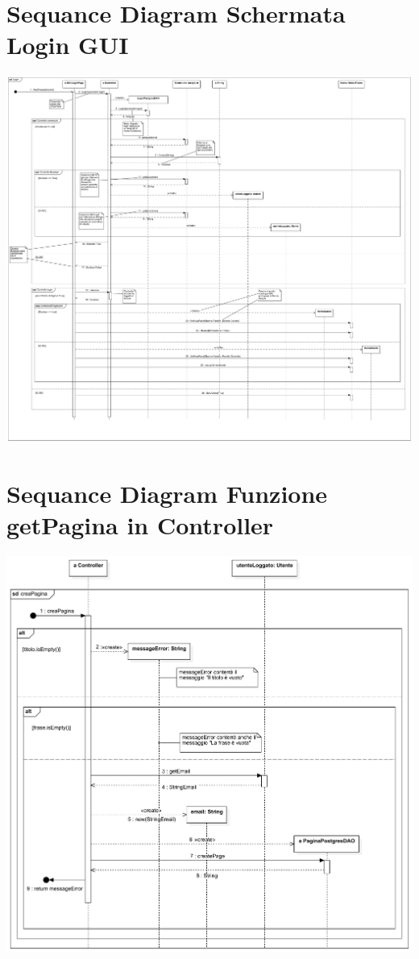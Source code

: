 \documentclass{article}
\begin{document}
\section{Sequance Diagram Schermata Login GUI}
\includegraphics[width=1.3\textwidth]{SequanceLogin.pdf}
\section{Sequance Diagram Funzione getPagina in Controller}
\includegraphics[width=1.3\textwidth]{SequancecreaPagina.pdf}
\end{document}
